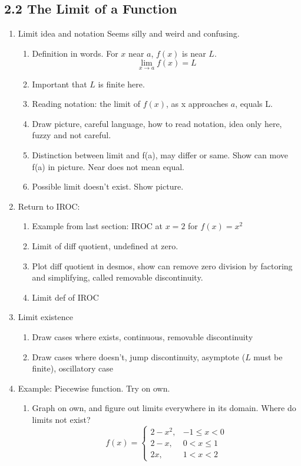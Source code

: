 \documentclass{article}
\begin{document}
\subsection{2.2 The Limit of a Function}
\begin{enumerate}

\item Limit idea and notation
Seems silly and weird and confusing. 
\begin{enumerate}
\item Definition in words. For $x$ near $a$, $f(x)$ is near $L$. 
$$
\lim_{x\rightarrow a} f(x) = L
$$
\item Important that $L$ is finite here.
\item Reading notation: the limit of $f(x)$, as x approaches $a$, equals L. 
\item Draw picture, careful language, how to read notation, idea only here, fuzzy and not careful.
\item Distinction between limit and f(a), may differ or same. Show can move f(a) in picture. Near does not mean equal.
\item Possible limit doesn’t exist. Show picture.
\end{enumerate}

\item Return to IROC:
\begin{enumerate}
\item Example from last section: IROC at $x=2$ for $f(x)=x^2$
\item Limit of diff quotient, undefined at zero.
\item Plot diff quotient in desmos, show can remove zero division by factoring and simplifying, called removable discontinuity.
\item Limit def of IROC
\end{enumerate}

\item Limit existence
\begin{enumerate}
\item Draw cases where exists, continuous, removable discontinuity
\item Draw cases where doesn't, jump discontinuity, asymptote ($L$ must be finite), oscillatory case
\end{enumerate}

\item Example: Piecewise function. Try on own.
\begin{enumerate}
\item Graph on own, and figure out limits everywhere in its domain. Where do limits not exist?
\[
f(x) = \begin{cases}
2-x^2, & -1 \leq x < 0 \\
2-x, & 0<x \leq 1 \\
2x, & 1<x<2
\end{cases}
\]
\end{enumerate}



\end{enumerate}
\end{document}
